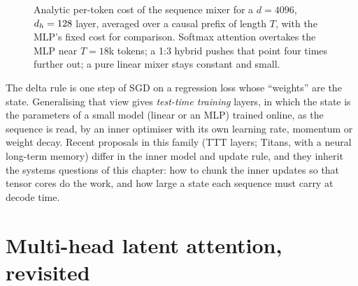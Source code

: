 \begin{figure}[t]
\centering
{}
\caption{Analytic per-token cost of the sequence mixer for a $d=4096$, $d_{h}=128$ layer, averaged over a
causal prefix of length $T$, with the MLP's fixed cost for comparison. Softmax attention overtakes the MLP
near $T=18$k tokens; a 1:3 hybrid pushes that point four times further out; a pure linear mixer stays
constant and small.}
\label{fig:attnalt:flops}
\end{figure}

\begin{deepdive}
The delta rule is one step of SGD on a regression loss whose ``weights'' are the state. Generalising that
view gives \emph{test-time training} layers, in which the state is the parameters of a small model (linear or
an MLP) trained online, as the sequence is read, by an inner optimiser with its own learning rate,
momentum or weight decay. Recent proposals in this family (TTT layers; Titans, with a neural long-term
memory) differ in the inner model and update rule, and they inherit the systems questions of this chapter: how
to chunk the inner updates so that tensor cores do the work, and how large a state each sequence must carry
at decode time.
\end{deepdive}


\section{Multi-head latent attention, revisited}\label{sec:attnalt:mla}

